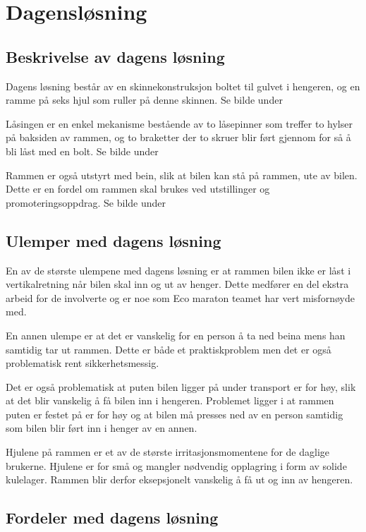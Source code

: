 \section{Dagensløsning}
\subsection{Beskrivelse av dagens løsning}

Dagens løsning består av en skinnekonstruksjon boltet til gulvet i hengeren, og en ramme på seks hjul som ruller på denne skinnen. Se bilde under

Låsingen er en enkel mekanisme bestående av to låsepinner som treffer to hylser på baksiden av rammen, og to braketter der to skruer blir ført gjennom for så å bli låst med en bolt. Se bilde under

Rammen er også utstyrt med bein, slik at bilen kan stå på rammen, ute av bilen. Dette er en fordel om rammen skal brukes ved utstillinger og promoteringsoppdrag.  Se bilde under
\subsection{Ulemper med dagens løsning}

En av de største ulempene med dagens løsning er at rammen bilen ikke er låst i vertikalretning når bilen skal inn og ut av henger. Dette medfører en del ekstra arbeid for de involverte og er noe som Eco maraton teamet har vert misfornøyde med.

En annen ulempe er at det er vanskelig for en person å ta ned beina mens han samtidig tar ut rammen. Dette er både et praktiskproblem men det er også problematisk rent sikkerhetsmessig. 

Det er også problematisk at puten bilen ligger på under transport er for høy, slik at det blir vanskelig å få bilen inn i hengeren. Problemet ligger i at rammen puten er festet på er for høy og at bilen må presses ned av en person samtidig som bilen blir ført inn i henger av en annen.

Hjulene på rammen er et av de største irritasjonsmomentene for de daglige brukerne. Hjulene er for små og mangler nødvendig opplagring i form av solide kulelager. Rammen blir derfor eksepsjonelt vanskelig å få ut og inn av hengeren. 

\subsection{Fordeler med dagens løsning}

